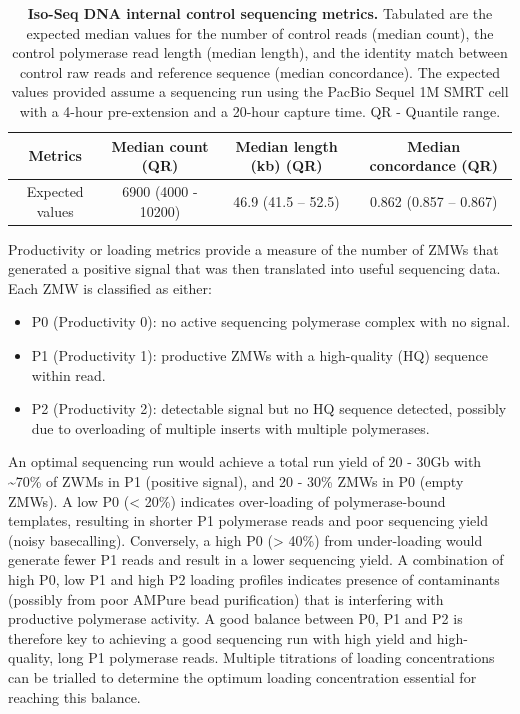 \vspace{1cm}
\begin{table}[!h]
    \setlength\tabcolsep{4pt} %
	\caption[Iso-Seq DNA internal control sequencing metrics]%
	{\textbf{Iso-Seq DNA internal control sequencing metrics.} Tabulated are the expected median values for the number of control reads (median count), the control polymerase read length (median length), and the identity match between control raw reads and reference sequence (median concordance). The expected values provided assume a sequencing run using the PacBio Sequel 1M SMRT cell with a 4-hour pre-extension and a 20-hour capture time. QR - Quantile range.}	\label{tab:control_Isoseqmetrics}
	
	\centering
	\begin{tabular}{@{}cccc@{}}
		\toprule
		Metrics         & Median count (QR)     & Median length (kb) (QR) & Median concordance (QR) \\ \midrule
		Expected values & 6900 (4000 - 10200) & 46.9 (41.5 – 52.5) & 0.862 (0.857 – 0.867)   \\ \bottomrule
	\end{tabular}
\end{table}


Productivity or loading metrics provide a measure of the number of ZMWs that generated a positive signal that was then translated into useful sequencing data. Each ZMW is classified as either: 
\begin{itemize}
	\item P0 (Productivity 0): no active sequencing polymerase complex with no signal. 
	\item P1 (Productivity 1): productive ZMWs with a high-quality (HQ) sequence within read.
	\item P2 (Productivity 2): detectable signal but no HQ sequence detected, possibly due to overloading of multiple inserts with multiple polymerases.
\end{itemize}

An optimal sequencing run would achieve a total run yield of 20 - 30Gb with \textasciitilde70\% of ZWMs in P1 (positive signal), and 20 - 30\% ZMWs in P0 (empty ZMWs). A low P0 (< 20\%) indicates over-loading of polymerase-bound templates, resulting in shorter P1 polymerase reads and poor sequencing yield (noisy basecalling). Conversely, a high P0 (> 40\%) from under-loading would generate fewer P1 reads and result in a lower sequencing yield. A combination of high P0, low P1 and high P2 loading profiles indicates presence of contaminants (possibly from poor AMPure bead purification) that is interfering with productive polymerase activity. A good balance between P0, P1 and P2 is therefore key to achieving a good sequencing run with high yield and high-quality, long P1 polymerase reads. Multiple titrations of loading concentrations can be trialled to determine the optimum loading concentration essential for reaching this balance. 

